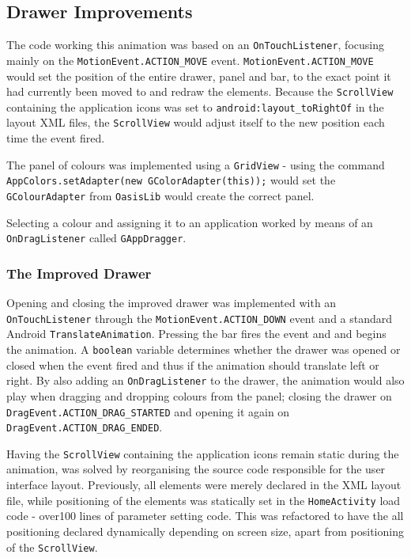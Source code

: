 \subsection{Drawer Improvements}\label{sec:developments:drawerimprovements}
The code working this animation was based on an \lstinline{OnTouchListener}, focusing mainly on the \lstinline{MotionEvent.ACTION_MOVE} event.
\lstinline{MotionEvent.ACTION_MOVE} would set the position of the entire drawer, panel and bar, to the exact point it had currently been moved to and redraw the elements.
Because the \lstinline{ScrollView} containing the application icons was set to \lstinline{android:layout_toRightOf} in the layout XML files, the \lstinline{ScrollView} would adjust itself to the new position each time the event fired.

The panel of colours was implemented using a \lstinline{GridView} - using the command \lstinline{AppColors.setAdapter(new GColorAdapter(this));} would set the \lstinline{GColourAdapter} from \lstinline{OasisLib} would create the correct panel.

Selecting a colour and assigning it to an application worked by means of an \lstinline{OnDragListener} called \lstinline{GAppDragger}.

\subsubsection{The Improved Drawer}

Opening and closing the improved drawer was implemented with an \lstinline{OnTouchListener} through the \lstinline{MotionEvent.ACTION_DOWN} event and a standard Android \lstinline{TranslateAnimation}.
Pressing the bar fires the event and and begins the animation.
A \lstinline{boolean} variable determines whether the drawer was opened or closed when the event fired and thus if the animation should translate left or right.
By also adding an \lstinline{OnDragListener} to the drawer, the animation would also play when dragging and dropping colours from the panel; closing the drawer on \lstinline{DragEvent.ACTION_DRAG_STARTED} and opening it again on \lstinline{DragEvent.ACTION_DRAG_ENDED}.

Having the \lstinline{ScrollView} containing the application icons remain static during the animation, was solved by reorganising the source code responsible for the user interface layout. 
Previously, all elements were merely declared in the XML layout file, while positioning of the elements was statically set in the \lstinline{HomeActivity} load code - over100 lines of parameter setting code.
This was refactored to have the all positioning declared dynamically depending on screen size, apart from positioning of the \lstinline{ScrollView}.

